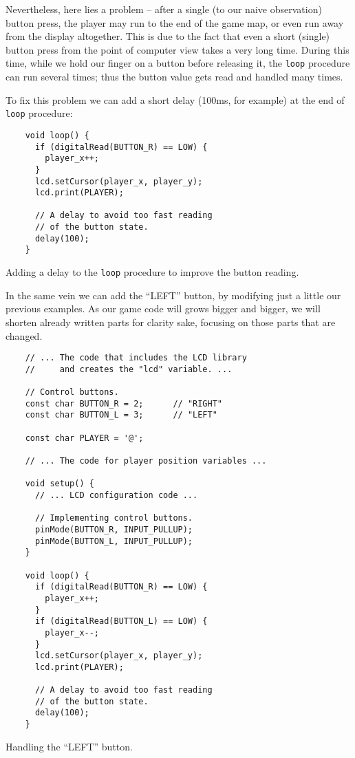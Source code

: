 \documentclass[../sparc.tex]{subfiles}
\begin{document}
Nevertheless, here lies a problem -- after a single (to our naive observation)
button press, the player may run to the end of the game map, or even run away
from the display altogether.  This is due to the fact that even a short (single)
button press from the point of computer view takes a very long time.  During
this time, while we hold our finger on a button before releasing it, the
\texttt{loop} procedure can run several times; thus the button value
gets read and handled many times.

To fix this problem we can add a short delay (100ms, for example) at the end of
\texttt{loop} procedure:

\begin{listing}[H]
  \begin{verbatim}
    void loop() {
      if (digitalRead(BUTTON_R) == LOW) {
        player_x++;
      }
      lcd.setCursor(player_x, player_y);
      lcd.print(PLAYER);

      // A delay to avoid too fast reading
      // of the button state.
      delay(100);
    }
  \end{verbatim}
  \caption{Adding a delay to the \texttt{loop} procedure to improve the
    button reading.}
  \label{listing:game-dev-button-delay}
\end{listing}

In the same vein we can add the ``LEFT'' button, by modifying just a little our
previous examples.  As our game code will grows bigger and bigger, we will
shorten already written parts for clarity sake, focusing on those parts that are
changed.

\begin{listing}[H]
  \begin{verbatim}
    // ... The code that includes the LCD library
    //     and creates the "lcd" variable. ...

    // Control buttons.
    const char BUTTON_R = 2;      // "RIGHT"
    const char BUTTON_L = 3;      // "LEFT"

    const char PLAYER = '@';

    // ... The code for player position variables ...

    void setup() {
      // ... LCD configuration code ...

      // Implementing control buttons.
      pinMode(BUTTON_R, INPUT_PULLUP);
      pinMode(BUTTON_L, INPUT_PULLUP);
    }

    void loop() {
      if (digitalRead(BUTTON_R) == LOW) {
        player_x++;
      }
      if (digitalRead(BUTTON_L) == LOW) {
        player_x--;
      }
      lcd.setCursor(player_x, player_y);
      lcd.print(PLAYER);

      // A delay to avoid too fast reading
      // of the button state.
      delay(100);
    }
  \end{verbatim}
  \caption{Handling the ``LEFT'' button.}
  \label{listing:game-dev-button-left}
\end{listing}
\end{document}
